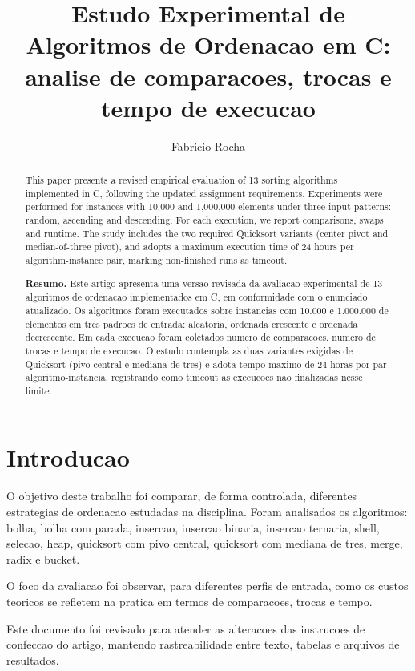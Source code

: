 \documentclass[12pt]{article}
\title{Estudo Experimental de Algoritmos de Ordenacao em C: analise de comparacoes, trocas e tempo de execucao}
\author{Fabricio Rocha\inst{1}}
\makeatletter
\newcommand{\@address}{}
\newcommand{\printaddress}{\begin{center}\@address\end{center}}
\newcommand{\printaddress}{}
\newenvironment{resumo}{\begin{abstract}\textbf{Resumo.} }{\end{abstract}}
\makeatother
\begin{document}
\maketitle
\printaddress

\begin{abstract}
This paper presents a revised empirical evaluation of 13 sorting algorithms implemented
in C, following the updated assignment requirements. Experiments were performed for
instances with 10,000 and 1,000,000 elements under three input patterns: random,
ascending and descending. For each execution, we report comparisons, swaps and runtime.
The study includes the two required Quicksort variants (center pivot and median-of-three
pivot), and adopts a maximum execution time of 24 hours per algorithm-instance pair,
marking non-finished runs as timeout.
\end{abstract}

\begin{resumo}
Este artigo apresenta uma versao revisada da avaliacao experimental de 13 algoritmos de
ordenacao implementados em C, em conformidade com o enunciado atualizado. Os
algoritmos foram executados sobre instancias com 10.000 e 1.000.000 de elementos em
tres padroes de entrada: aleatoria, ordenada crescente e ordenada decrescente. Em cada
execucao foram coletados numero de comparacoes, numero de trocas e tempo de execucao.
O estudo contempla as duas variantes exigidas de Quicksort (pivo central e mediana de
tres) e adota tempo maximo de 24 horas por par algoritmo-instancia, registrando como
timeout as execucoes nao finalizadas nesse limite.
\end{resumo}

\section{Introducao}
O objetivo deste trabalho foi comparar, de forma controlada, diferentes estrategias de
ordenacao estudadas na disciplina. Foram analisados os algoritmos: bolha,
bolha com parada, insercao, insercao binaria, insercao ternaria, shell,
selecao, heap, quicksort com pivo central, quicksort com mediana de tres,
merge, radix e bucket.

O foco da avaliacao foi observar, para diferentes perfis de entrada, como os custos
teoricos se refletem na pratica em termos de comparacoes, trocas e tempo.

Este documento foi revisado para atender as alteracoes das instrucoes de confeccao do
artigo, mantendo rastreabilidade entre texto, tabelas e arquivos de resultados.
\end{document}
